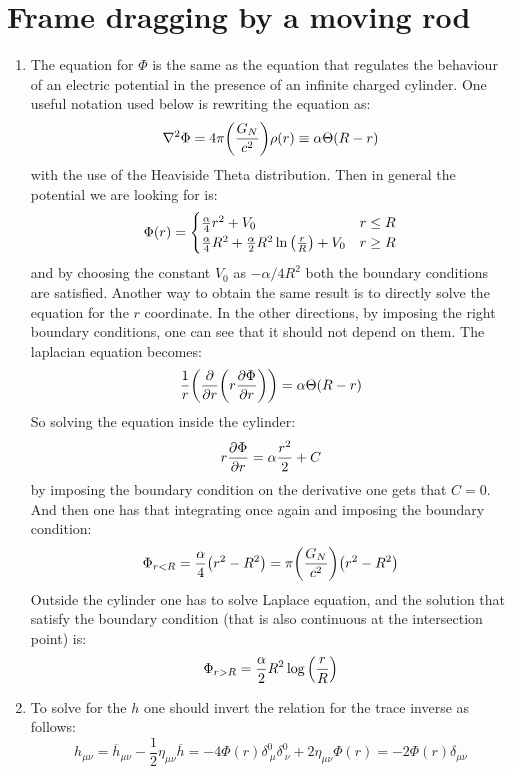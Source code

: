 \documentclass[11pt, oneside]{article}
\begin{document}
\section{Frame dragging by a moving rod}
\begin{enumerate}
\item The equation for $\Phi$ is the same as the equation that regulates the behaviour of an electric potential in the presence of an infinite charged cylinder. One useful notation used below is rewriting the equation as:
\[
	\laplacian \Phi = 4\pi \qty(\frac{G_N}{c^2}) \rho(r) \equiv \alpha \Theta(R-r)
\]
with the use of the Heaviside Theta distribution. Then in general the potential we are looking for is:
\[
	\Phi(r) = 
	\begin{cases}
		\frac{\alpha}{4} r^2 + V_0 & r \leq R \\
		\frac{\alpha}{4} R^2 +\frac{\alpha}{2} R^2 \ln\qty(\frac{r}{R}) + V_0& r \geq R
	\end{cases}
\]
and by choosing the constant $V_0$ as $-\alpha/4 R^2$ both the boundary conditions are satisfied. Another way to obtain the same result is to directly solve the equation for the $r$ coordinate. In the other directions, by imposing the right boundary conditions, one can see that it should not depend on them. The laplacian equation becomes:
\[
	\frac{1}{r} \qty( \pdv{r} \qty(r \pdv{\Phi}{r})) = \alpha \Theta (R- r)
\]
So solving the equation inside the cylinder:
\[
	r \pdv{\Phi}{r} = \alpha \frac{r^2}{2} + C
\]
by imposing the boundary condition on the derivative one gets that $C=0$. And then one has that integrating once again and imposing the boundary condition:
\[
	\Phi_{r<R} = \frac{\alpha}{4} \qty(r^2 - R^2) = \pi \qty(\frac{G_N}{c^2}) \qty(r^2 - R^2)
\]
Outside the cylinder one has to solve Laplace equation, and the solution that satisfy the boundary condition (that is also continuous at the intersection point) is:
\[
	\Phi_{r>R} = \frac{\alpha}{2}R^2 \log \qty(\frac{r}{R})
\]

\item To solve for the $h$ one should invert the relation for the trace inverse as follows:
\[
	h_{\mu\nu} = \overline{h}_{\mu\nu} - \frac{1}{2} \eta_{\mu\nu} \overline{h} = -4 \Phi(r) \delta^{0}_{~\mu}\delta^{0}_{~\nu} + 2 \eta_{\mu\nu} \Phi(r) = - 2 \Phi(r) \delta_{\mu\nu}
\]


\end{enumerate}
\end{document}
